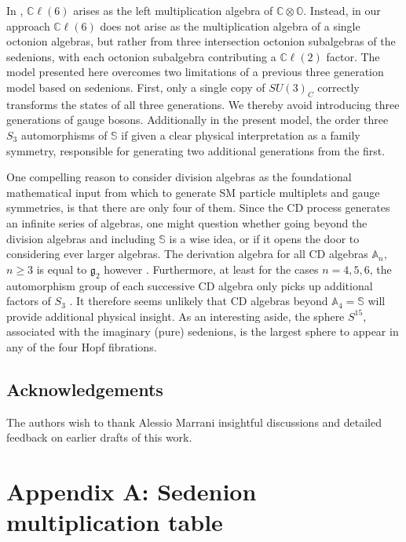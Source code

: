 \documentclass{article}
\newcommand{\bb}[1]{\mathbb{#1}}
\begin{document}
In \cite{dixon2013division,furey2016standard}, $\bb{C}\ell(6)$ arises as the left multiplication algebra of $\bb{C}\otimes\bb{O}$. Instead, in our approach $\bb{C}\ell(6)$ does not arise as the multiplication algebra of a single octonion algebras, but rather from three intersection octonion subalgebras of the sedenions, with each octonion subalgebra contributing a $\bb{C}\ell(2)$ factor. The model presented here overcomes two limitations of a previous three generation model based on sedenions. First, only a single copy of $SU(3)_C$ correctly transforms the states of all three generations. We thereby avoid introducing three generations of gauge bosons. Additionally in the present model, the order three $S_3$ automorphisms of $\bb{S}$ if given a clear physical interpretation as a family symmetry, responsible for generating two additional generations from the first.  

One compelling reason to consider division algebras as the foundational mathematical input from which to generate SM particle multiplets and gauge symmetries, is that there are only four of them. Since the CD process generates an infinite series of algebras, one might question whether going beyond the division algebras and including $\bb{S}$ is a wise idea, or if it opens the door to considering ever larger algebras. The derivation algebra for all CD algebras $\bb{A}_n$, $n\geq 3$ is equal to $\mathfrak{g}_2$ however \cite{schafer1954algebras}. Furthermore, at least for the cases $n=4,5,6$, the automorphism group of each successive CD algebra only picks up additional factors of $S_3$ \cite{brown1967generalized}. It therefore seems unlikely that CD algebras beyond $\bb{A}_4=\bb{S}$ will provide additional physical insight. As an interesting aside, the sphere $S^{15}$, associated with the imaginary (pure) sedenions, is the largest sphere to appear in any of the four Hopf fibrations.



\subsection*{Acknowledgements}
The authors wish to thank Alessio Marrani insightful discussions and detailed feedback on earlier drafts of this work. 

\section*{Appendix A: Sedenion multiplication table}
\end{document}
